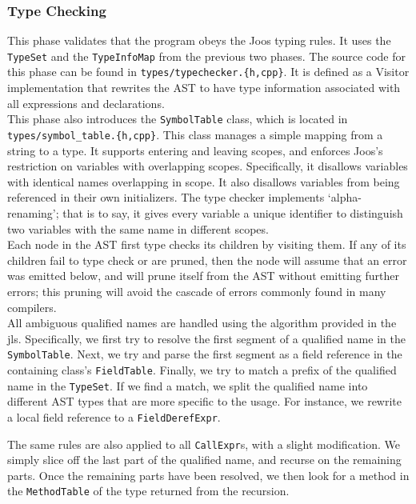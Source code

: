 \documentclass[12pt, titlepage]{article}
\newcommand{\z}[1]{\texttt{#1}}
\begin{document}
\subsubsection{Type Checking}\label{subsubsec:type-checking}

This phase validates that the program obeys the Joos typing rules. It uses the
\z{TypeSet} and the \z{TypeInfoMap} from the previous two phases. The source code
for this phase can be found in \z{types/typechecker.\{h,cpp\}}. It is defined as a
Visitor implementation that rewrites the AST to have type information
associated with all expressions and declarations.\\

This phase also introduces the \z{SymbolTable} class, which is located in
\z{types/symbol\_table.\{h,cpp\}}. This class manages a simple mapping from a string
to a type. It supports entering and leaving scopes, and enforces Joos's
restriction on variables with overlapping scopes. Specifically, it disallows
variables with identical names overlapping in scope. It also disallows
variables from being referenced in their own initializers. The type checker
implements `alpha-renaming'; that is to say, it gives every variable a unique
identifier to distinguish two variables with the same name in different scopes.\\

Each node in the AST first type checks its children by visiting them. If any of
its children fail to type check or are pruned, then the node will assume that
an error was emitted below, and will prune itself from the AST without emitting
further errors; this pruning will avoid the cascade of errors commonly found in
many compilers.\\

All ambiguous qualified names are handled using the algorithm provided in the
\ac{jls}. Specifically, we first try to resolve the first segment of a
qualified name in the \z{SymbolTable}. Next, we try and parse the first segment
as a field reference in the containing class's \z{FieldTable}. Finally, we try to
match a prefix of the qualified name in the \z{TypeSet}. If we find a match, we
split the qualified name into different AST types that are more specific to the
usage. For instance, we rewrite a local field reference to a \z{FieldDerefExpr}.

The same rules are also applied to all \z{CallExpr}s, with a slight modification.
We simply slice off the last part of the qualified name, and recurse on the
remaining parts. Once the remaining parts have been resolved, we then look for
a method in the \z{MethodTable} of the type returned from the recursion.
\end{document}
